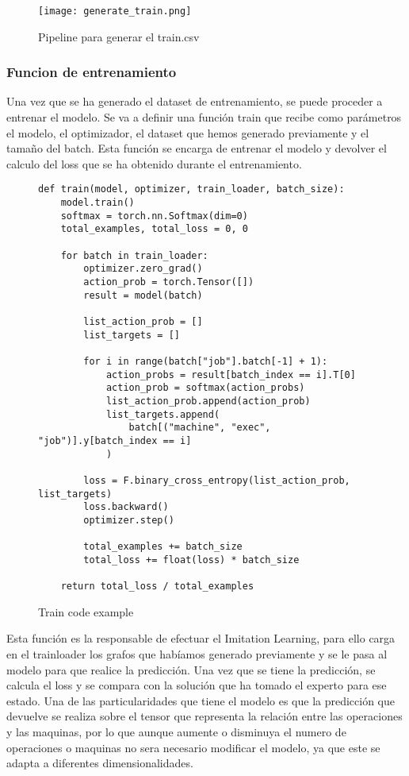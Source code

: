 \begin{figure}[ht]
    \centering
    \texttt{[image: generate\_train.png]}
    \caption{Pipeline para generar el train.csv}
    \label{fig:trainingpipeline}
\end{figure}

\subsubsection{Funcion de entrenamiento}
Una vez que se ha generado el dataset de entrenamiento, se puede proceder a entrenar el modelo.
Se va a definir una función train que recibe como parámetros el modelo, el optimizador, el dataset
que hemos generado previamente y el tamaño del batch. Esta función se encarga de entrenar el modelo
y devolver el calculo del loss que se ha obtenido durante el entrenamiento.\medskip

\begin{figure}[ht]
\begin{lstlisting}
def train(model, optimizer, train_loader, batch_size):
    model.train()
    softmax = torch.nn.Softmax(dim=0)
    total_examples, total_loss = 0, 0

    for batch in train_loader:
        optimizer.zero_grad()
        action_prob = torch.Tensor([])
        result = model(batch)

        list_action_prob = []
        list_targets = []

        for i in range(batch["job"].batch[-1] + 1):
            action_probs = result[batch_index == i].T[0]
            action_prob = softmax(action_probs)
            list_action_prob.append(action_prob)
            list_targets.append(
                batch[("machine", "exec", "job")].y[batch_index == i]
            )

        loss = F.binary_cross_entropy(list_action_prob, list_targets)
        loss.backward()
        optimizer.step()

        total_examples += batch_size
        total_loss += float(loss) * batch_size

    return total_loss / total_examples 
\end{lstlisting}\medskip
    \caption{Train code example}
    \label{fig:traincode}
\end{figure}

Esta función es la responsable de efectuar el Imitation Learning, para ello carga en el
trainloader los grafos que habíamos generado previamente y se le pasa al modelo para que
realice la predicción. Una vez que se tiene la predicción, se calcula el loss y se compara
con la solución que ha tomado el experto para ese estado. Una de las particularidades que
tiene el modelo es que la predicción que devuelve se realiza sobre el tensor que representa
la relación entre las operaciones y las maquinas, por lo que aunque aumente o disminuya 
el numero de operaciones o maquinas no sera necesario modificar el modelo, ya que este 
se adapta a diferentes dimensionalidades.

